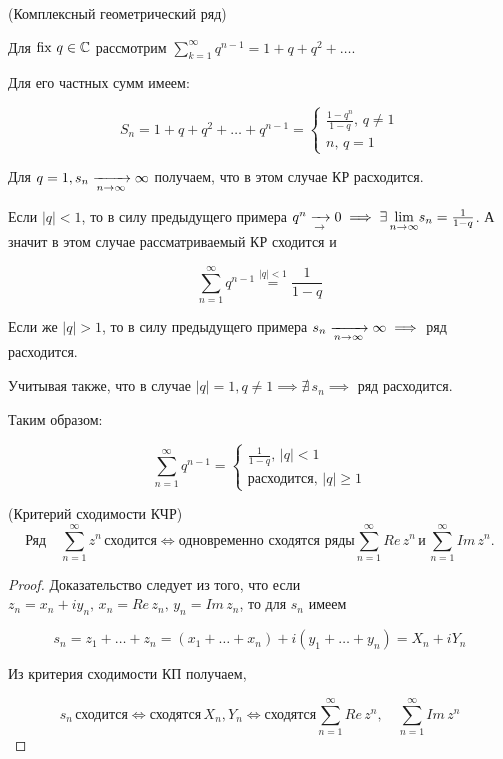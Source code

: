 \documentclass[../../main.tex]{subfiles}
\begin{document}
\begin{exmp}(Комплексный геометрический ряд)
	\;
	
	Для $ \operatorname{fix}\, q \in \mathbb{C} $ рассмотрим $ \sum_{k=1}^{\infty}q^{n - 1} = 1 + q + 
	q^2 + \ldots $.
	
	Для его частных сумм имеем:
	
	\[S_n = 1 + q + q^2 + \ldots + q^{n - 1} =
	\begin{cases}
		\frac{1 - q^n}{1 - q},\, q \neq 1 \\
		n,\, q = 1
	\end{cases}\]
	
	Для $ q = 1, s_n \xrightarrow[n \rightarrow \infty]{} \infty $ получаем, что в этом 
	случае КР расходится.
	
	Если $ |q| < 1 $, то в силу предыдущего примера $ q^n \xrightarrow[\rightarrow]{} 0 
	\implies \exists\, \underset{n \to \infty}{\lim} s_n = \frac{1}{1 - q} $. А 
	значит в этом случае рассматриваемый КР сходится и 
	
	\[\sum_{n=1}^{\infty}q^{n - 1} \stackrel{|q| < 1}{=} \frac{1}{1 - q}\]
	
	Если же $ |q| > 1 $, то в силу предыдущего примера $ s_n \xrightarrow[n \rightarrow 
	\infty]{} \infty \implies $ ряд расходится.
	
	Учитывая также, что в случае $ |q| = 1, q \neq 1 \implies \nexists\, s_n 
	\implies $ ряд расходится.
	
	Таким образом:
	
	\[\sum_{n=1}^{\infty}q^{n - 1} = 
	\begin{cases}
		\frac{1}{1 - q},\, |q| < 1 \\
		\text{расходится},\, |q| \geq 1
	\end{cases}\]
\end{exmp}

\begin{thm}(Критерий сходимости КЧР)
	\[\text{Ряд} \quad \sum_{n=1}^{\infty}z^n\, \text{сходится} \iff 
	\text{одновременно сходятся ряды} \sum_{n=1}^{\infty}Re\,z^n\, \text{и}\, 
	\sum_{n=1}^{\infty}Im\,z^n.\]
\end{thm}
\begin{proof}
	Доказательство следует из того, что если $ z_n = x_n + iy_n,\, x_n = 
	Re\,z_n,\, y_n = Im\,z_n $, то для $ s_n $ имеем
	
	\[s_n = z_1 + \ldots + z_n = (x_1 + \ldots + x_n) + i(y_1 + \ldots + y_n) = 
	X_n + iY_n\]
	
	Из критерия сходимости КП получаем, 
	
	\[ s_n\, \text{сходится} \iff \text{сходятся}\, X_n, Y_n \iff \text{сходятся} 
	\sum_{n=1}^{\infty}Re\,z^n, \quad \sum_{n=1}^{\infty}Im\,z^n \]
	\qedhere
\end{proof}
\end{document}
